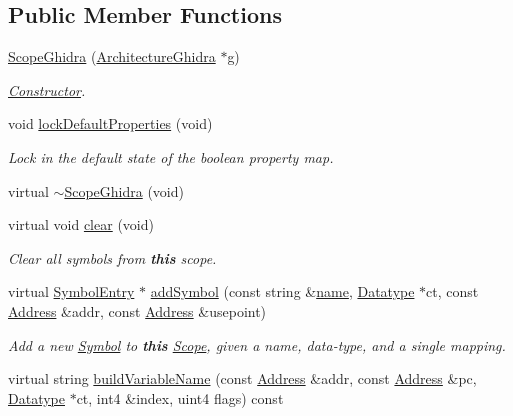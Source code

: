 \subsection*{Public Member Functions}
\begin{DoxyCompactItemize}
\item 
\mbox{\hyperlink{class_scope_ghidra_a715046c5b708da35b3547780a3226713}{Scope\+Ghidra}} (\mbox{\hyperlink{class_architecture_ghidra}{Architecture\+Ghidra}} $\ast$g)
\begin{DoxyCompactList}\small\item\em \mbox{\hyperlink{class_constructor}{Constructor}}. \end{DoxyCompactList}\item 
void \mbox{\hyperlink{class_scope_ghidra_a912898628da7cab6ec50207b9d9bd418}{lock\+Default\+Properties}} (void)
\begin{DoxyCompactList}\small\item\em Lock in the default state of the boolean property map. \end{DoxyCompactList}\item 
virtual \mbox{\hyperlink{class_scope_ghidra_acea26620410be12295f5b6e7e1ae9a02}{$\sim$\+Scope\+Ghidra}} (void)
\item 
virtual void \mbox{\hyperlink{class_scope_ghidra_a2ebfecc6211081f8f2411c006cc867de}{clear}} (void)
\begin{DoxyCompactList}\small\item\em Clear all symbols from {\bfseries{this}} scope. \end{DoxyCompactList}\item 
virtual \mbox{\hyperlink{class_symbol_entry}{Symbol\+Entry}} $\ast$ \mbox{\hyperlink{class_scope_ghidra_abb80f5f1b2391d5865f3c75ec1e03644}{add\+Symbol}} (const string \&\mbox{\hyperlink{class_scope_abb4900f6409e8a82c1b1cea827e4e2c5}{name}}, \mbox{\hyperlink{class_datatype}{Datatype}} $\ast$ct, const \mbox{\hyperlink{class_address}{Address}} \&addr, const \mbox{\hyperlink{class_address}{Address}} \&usepoint)
\begin{DoxyCompactList}\small\item\em Add a new \mbox{\hyperlink{class_symbol}{Symbol}} to {\bfseries{this}} \mbox{\hyperlink{class_scope}{Scope}}, given a name, data-\/type, and a single mapping. \end{DoxyCompactList}\item 
virtual string \mbox{\hyperlink{class_scope_ghidra_a4a8ab1c82c0d5101e7e2f5cdd5cc8268}{build\+Variable\+Name}} (const \mbox{\hyperlink{class_address}{Address}} \&addr, const \mbox{\hyperlink{class_address}{Address}} \&pc, \mbox{\hyperlink{class_datatype}{Datatype}} $\ast$ct, int4 \&index, uint4 flags) const

\end{DoxyCompactItemize}
